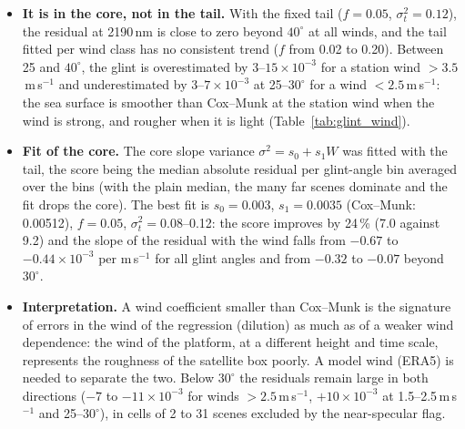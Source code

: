 \documentclass[11pt,a4paper]{article}
\begin{document}
\begin{itemize}
\item \textbf{It is in the core, not in the tail.} With the fixed tail ($f=0.05$, $\sigma_t^2=0.12$), the residual
  at 2190\,nm is close to zero beyond $40^\circ$ at all winds, and the tail fitted per wind class has no consistent
  trend ($f$ from 0.02 to 0.20). Between 25 and $40^\circ$, the glint is overestimated by 3--$15\times10^{-3}$ for a
  station wind $>3.5$\,m\,s$^{-1}$ and underestimated by 3--$7\times10^{-3}$ at 25--$30^\circ$ for a wind
  $<2.5$\,m\,s$^{-1}$: the sea surface is smoother than Cox--Munk at the station wind when the wind is strong, and
  rougher when it is light (Table~\ref{tab:glint_wind}).
\item \textbf{Fit of the core.} The core slope variance $\sigma^2 = s_0 + s_1 W$ was fitted with the tail, the
  score being the median absolute residual per glint-angle bin averaged over the bins (with the plain median, the
  many far scenes dominate and the fit drops the core). The best fit is $s_0 = 0.003$, $s_1 = 0.0035$ (Cox--Munk:
  0.00512), $f = 0.05$, $\sigma_t^2 = 0.08$--0.12: the score improves by 24\,\% (7.0 against 9.2) and the slope of
  the residual with the wind falls from $-0.67$ to $-0.44\times10^{-3}$ per m\,s$^{-1}$ for all glint angles and
  from $-0.32$ to $-0.07$ beyond $30^\circ$.
\item \textbf{Interpretation.} A wind coefficient smaller than Cox--Munk is the signature of errors in the wind of
  the regression (dilution) as much as of a weaker wind dependence: the wind of the platform, at a different height
  and time scale, represents the roughness of the satellite box poorly. A model wind (ERA5) is needed to separate the
  two. Below $30^\circ$ the residuals remain large in both directions ($-7$ to $-11\times10^{-3}$ for winds
  $>2.5$\,m\,s$^{-1}$, $+10\times10^{-3}$ at 1.5--2.5\,m\,s$^{-1}$ and 25--$30^\circ$), in cells of 2 to 31 scenes
  excluded by the near-specular flag.
\end{itemize}
\end{document}
